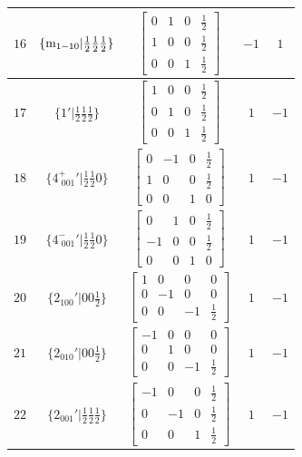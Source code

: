 \documentclass[fleqn,8pt]{jsarticle}
\begin{document}
\begin{longtable}{ccccc}
$ 16 $ & $ \{{\rm m}_{1-10}|\frac{1}{2} \frac{1}{2} \frac{1}{2}\} $ & $ \begin{bmatrix} 0 & 1 & 0 & \frac{1}{2} \\ 1 & 0 & 0 & \frac{1}{2} \\ 0 & 0 & 1 & \frac{1}{2} \end{bmatrix} $ & $ -1 $ & $ 1 $ \\ \hline
$ 17 $ & $ \{1{}'|\frac{1}{2} \frac{1}{2} \frac{1}{2}\} $ & $ \begin{bmatrix} 1 & 0 & 0 & \frac{1}{2} \\ 0 & 1 & 0 & \frac{1}{2} \\ 0 & 0 & 1 & \frac{1}{2} \end{bmatrix} $ & $ 1 $ & $ -1 $ \\ \hline
$ 18 $ & $ \{4^{+}_{\,\,001}{}'|\frac{1}{2} \frac{1}{2} 0\} $ & $ \begin{bmatrix} 0 & -1 & 0 & \frac{1}{2} \\ 1 & 0 & 0 & \frac{1}{2} \\ 0 & 0 & 1 & 0 \end{bmatrix} $ & $ 1 $ & $ -1 $ \\ \hline
$ 19 $ & $ \{4^{-}_{\,\,001}{}'|\frac{1}{2} \frac{1}{2} 0\} $ & $ \begin{bmatrix} 0 & 1 & 0 & \frac{1}{2} \\ -1 & 0 & 0 & \frac{1}{2} \\ 0 & 0 & 1 & 0 \end{bmatrix} $ & $ 1 $ & $ -1 $ \\ \hline
$ 20 $ & $ \{2{}_{100}{}'|0 0 \frac{1}{2}\} $ & $ \begin{bmatrix} 1 & 0 & 0 & 0 \\ 0 & -1 & 0 & 0 \\ 0 & 0 & -1 & \frac{1}{2} \end{bmatrix} $ & $ 1 $ & $ -1 $ \\ \hline
$ 21 $ & $ \{2{}_{010}{}'|0 0 \frac{1}{2}\} $ & $ \begin{bmatrix} -1 & 0 & 0 & 0 \\ 0 & 1 & 0 & 0 \\ 0 & 0 & -1 & \frac{1}{2} \end{bmatrix} $ & $ 1 $ & $ -1 $ \\ \hline
$ 22 $ & $ \{2{}_{001}{}'|\frac{1}{2} \frac{1}{2} \frac{1}{2}\} $ & $ \begin{bmatrix} -1 & 0 & 0 & \frac{1}{2} \\ 0 & -1 & 0 & \frac{1}{2} \\ 0 & 0 & 1 & \frac{1}{2} \end{bmatrix} $ & $ 1 $ & $ -1 $ \\ \hline

\end{longtable}
\end{document}

